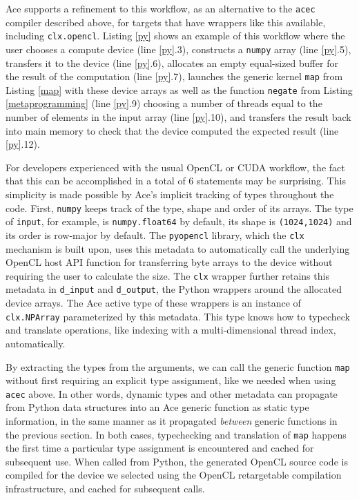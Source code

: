 \documentclass[10pt,preprint]{sigplanconf}
\begin{document}
{Ace supports a refinement to this workflow, as an alternative to the \verb|acec| compiler described above, for targets that have wrappers like this available, including \verb|clx.opencl|. Listing \ref{py} shows an example of this workflow where the user chooses a compute device (line \ref{py}.3),  constructs a \verb|numpy| array (line \ref{py}.5), transfers it to the device (line \ref{py}.6), allocates an empty equal-sized buffer for the result of the computation (line \ref{py}.7), launches the {generic} kernel \verb|map| from Listing \ref{map} with these device arrays as well as the function \verb|negate| from Listing \ref{metaprogramming} (line \ref{py}.9) choosing a number of threads equal to the number of elements in the input array (line \ref{py}.10), and transfers the result back into main memory to check that the device computed the expected result (line \ref{py}.12).

For developers experienced with the usual OpenCL or CUDA workflow, the fact that this can be accomplished in a total of 6 statements may be surprising. This simplicity is made possible by Ace's implicit tracking of types throughout the code. First, \verb|numpy| keeps track of the type, shape and order of its arrays. The type of \verb|input|, for example, is \verb|numpy.float64| by default, its shape is \verb|(1024,1024)| and its order is row-major by default. The \verb|pyopencl| library, which the \verb|clx| mechanism is built upon, uses this metadata to automatically call the underlying OpenCL host API function for transferring byte arrays to the device without requiring the user to calculate the size. The \verb|clx| wrapper further retains this metadata in \verb|d_input| and \verb|d_output|, the Python wrappers around the allocated device arrays. The Ace active type of these wrappers is an instance of \verb|clx.NPArray| parameterized by this metadata. This type knows how to typecheck and translate operations, like indexing with a multi-dimensional thread index, automatically.

By extracting the types from the arguments, we can call the generic function \verb|map| without first requiring an explicit type assignment, like we needed when using \verb|acec| above. In other words, dynamic types and other metadata can propagate from Python data structures into an Ace generic function as static type information, in the same manner as it propagated \emph{between} generic functions in the previous section. In both cases, typechecking and translation of \verb|map| happens the first time a particular type assignment is encountered and cached for subsequent use. When called from Python, the generated OpenCL source code is compiled for the device we selected using the OpenCL retargetable compilation infrastructure, and cached for subsequent calls. 

}
\end{document}

